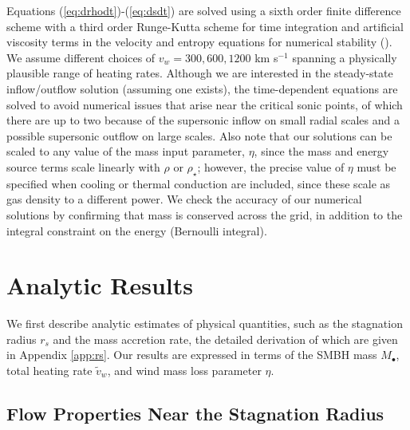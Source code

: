 \documentclass[usenatbib,fleqn]{mn2e}
\newcommand{\rs}{r_s}
\begin{document}
Equations (\ref{eq:drhodt})-(\ref{eq:dsdt}) are solved using a sixth
order finite difference scheme with a third order Runge-Kutta scheme
for time integration and artificial viscosity terms in the velocity
and entropy equations for numerical stability
(\citealt{Brandenburg:2003a}).  We assume different
choices of $v_{w} = 300, 600, 1200$ km s$^{-1}$ spanning a
physically plausible range of heating rates.  Although we are interested in the steady-state inflow/outflow solution (assuming one exists), the time-dependent equations are solved to avoid numerical issues that arise near the critical sonic points, of which there are up to two because of the supersonic
inflow on small radial scales and a possible supersonic outflow on large scales.  Also note that our solutions can be scaled to any value of the mass input parameter, $\eta$, since the mass and energy source terms scale linearly with $\rho$ or $\rho_{\star}$; however, the precise value of $\eta$ must be specified when cooling or thermal conduction are included, since these scale as gas density to a different power.  We check the accuracy of our numerical solutions by confirming that mass is conserved across the grid, in addition to the integral constraint on the energy (Bernoulli integral). 



\section{Analytic Results}
\label{sec:results}

We first describe analytic estimates of physical quantities, such as the stagnation radius $\rs$ and the mass accretion rate, the detailed derivation of which are given in Appendix \ref{app:rs}.  Our results are expressed in terms of the SMBH mass $M_{\bullet}$, total heating rate $\tilde{v}_{w}$, and wind mass loss parameter $\eta$.

\subsection{Flow Properties Near the Stagnation Radius}
\end{document}
